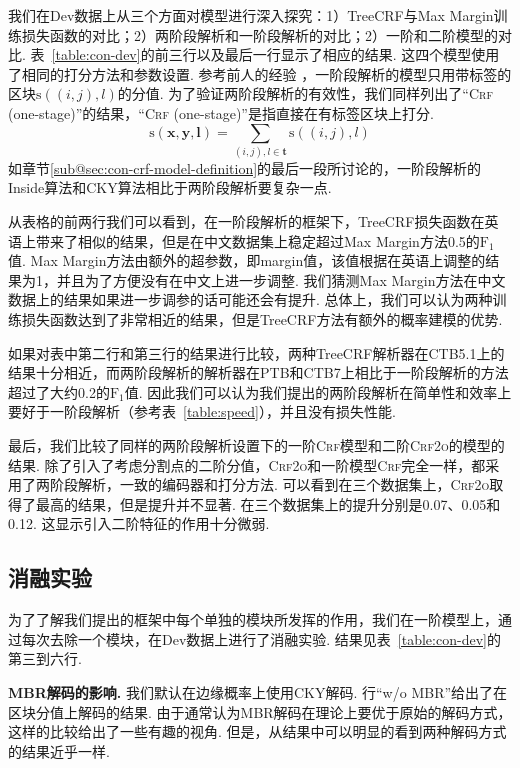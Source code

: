 我们在Dev数据上从三个方面对模型进行深入探究：1）TreeCRF与Max Margin训练损失函数的对比；2）两阶段解析和一阶段解析的对比；2）一阶和二阶模型的对比.
表~\ref{table:con-dev}的前三行以及最后一行显示了相应的结果.
这四个模型使用了相同的打分方法和参数设置.
参考前人的经验 \citep{stern-etal-2017-minimal}，一阶段解析的模型只用带标签的区块$\mathrm{s}((i,j),l)$的分值.
为了验证两阶段解析的有效性，我们同样列出了``\textsc{Crf} (one-stage)''的结果，``\textsc{Crf} (one-stage)''是指直接在有标签区块上打分.
\begin{equation} \label{eq:tree-label-score}
  \mathrm{s}(\boldsymbol{x},\boldsymbol{y},\boldsymbol{l}) =
  \sum_{(i,j),l \in \boldsymbol{t}} \mathrm{s}((i,j),l)
\end{equation}
如章节\ref{sub@sec:con-crf-model-definition}的最后一段所讨论的，一阶段解析的Inside算法和CKY算法相比于两阶段解析要复杂一点.

从表格的前两行我们可以看到，在一阶段解析的框架下，TreeCRF损失函数在英语上带来了相似的结果，但是在中文数据集上稳定超过Max Margin方法0.5的$\mathrm{F}_1$值.
Max Margin方法由额外的超参数，即margin值，该值根据在英语上调整的结果为1，并且为了方便没有在中文上进一步调整.
我们猜测Max Margin方法在中文数据上的结果如果进一步调参的话可能还会有提升.
总体上，我们可以认为两种训练损失函数达到了非常相近的结果，但是TreeCRF方法有额外的概率建模的优势.

如果对表中第二行和第三行的结果进行比较，两种TreeCRF解析器在CTB5.1上的结果十分相近，而两阶段解析的解析器在PTB和CTB7上相比于一阶段解析的方法超过了大约0.2的$\mathrm{F}_1$值.
因此我们可以认为我们提出的两阶段解析在简单性和效率上要好于一阶段解析（参考表~\ref{table:speed}），并且没有损失性能.

最后，我们比较了同样的两阶段解析设置下的一阶\textsc{Crf}模型和二阶\textsc{Crf2o}的模型的结果.
除了引入了考虑分割点的二阶分值，\textsc{Crf2o}和一阶模型\textsc{Crf}完全一样，都采用了两阶段解析，一致的编码器和打分方法.
可以看到在三个数据集上，\textsc{Crf2o}取得了最高的结果，但是提升并不显著.
在三个数据集上的提升分别是0.07、0.05和0.12.
这显示引入二阶特征的作用十分微弱.

\subsection{消融实验}

为了了解我们提出的框架中每个单独的模块所发挥的作用，我们在一阶模型上，通过每次去除一个模块，在Dev数据上进行了消融实验.
结果见表~\ref{table:con-dev}的第三到六行.

\noindent\textbf{MBR解码的影响.}
我们默认在边缘概率上使用CKY解码.
行``w/o MBR''给出了在区块分值上解码的结果.
由于通常认为MBR解码在理论上要优于原始的解码方式，这样的比较给出了一些有趣的视角.
但是，从结果中可以明显的看到两种解码方式的结果近乎一样.

